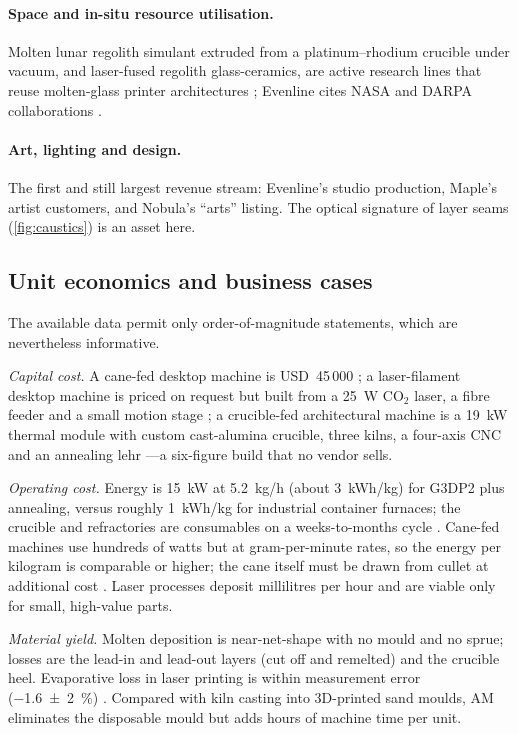 \paragraph{Space and in-situ resource utilisation.} Molten lunar regolith simulant extruded from a platinum--rhodium crucible under vacuum, and laser-fused regolith glass-ceramics, are active research lines that reuse molten-glass printer architectures \citep{regolithreview2023,regolithvac2024}; Evenline cites NASA and DARPA collaborations \citep{rit2023}.

\paragraph{Art, lighting and design.} The first and still largest revenue stream: Evenline's studio production, Maple's artist customers, and Nobula's ``arts'' listing. The optical signature of layer seams (\cref{fig:caustics}) is an asset here.

\subsection{Unit economics and business cases}
The available data permit only order-of-magnitude statements, which are nevertheless informative.

\emph{Capital cost.} A cane-fed desktop machine is USD~45\,000 \citep{maple_aniwaa}; a laser-filament desktop machine is priced on request but built from a \SI{25}{W} CO$_2$ laser, a fibre feeder and a small motion stage \citep{kth2022bonding,nobula_aniwaa}; a crucible-fed architectural machine is a \SI{19}{kW} thermal module with custom cast-alumina crucible, three kilns, a four-axis CNC and an annealing lehr \citep{inamura2018}---a six-figure build that no vendor sells.

\emph{Operating cost.} Energy is \SI{15}{kW} at \SI{5.2}{kg/h} (about \SI{3}{kWh/kg}) for G3DP2 plus annealing, versus roughly \SI{1}{kWh/kg} for industrial container furnaces; the crucible and refractories are consumables on a weeks-to-months cycle \citep{inamura2018,mit2024masonry}. Cane-fed machines use hundreds of watts but at gram-per-minute rates, so the energy per kilogram is comparable or higher; the cane itself must be drawn from cullet at additional cost \citep{maple_ammedia}. Laser processes deposit millilitres per hour and are viable only for small, high-value parts.

\emph{Material yield.} Molten deposition is near-net-shape with no mould and no sprue; losses are the lead-in and lead-out layers (cut off and remelted) and the crucible heel. Evaporative loss in laser printing is within measurement error (\SI{-1.6 +- 2}{\percent}) \citep{kth2022bonding}. Compared with kiln casting into 3D-printed sand moulds, AM eliminates the disposable mould but adds hours of machine time per unit.

